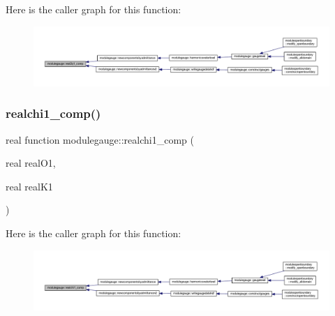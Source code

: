 Here is the caller graph for this function\+:\nopagebreak
\begin{figure}[H]
\begin{center}
\leavevmode
\includegraphics[width=350pt]{namespacemodulegauge_a3570d6ed4834d7d873f7b068c99c9ef5_icgraph}
\end{center}
\end{figure}
\mbox{\label{namespacemodulegauge_ab5f77ac1ee7d3ccaa97fe4e99a711bdb}} 
\subsubsection{\texorpdfstring{realchi1\+\_\+comp()}{realchi1\_comp()}}
{\footnotesize\ttfamily real function modulegauge\+::realchi1\+\_\+comp (\begin{DoxyParamCaption}\item[{real}]{real\+O1,  }\item[{real}]{real\+K1 }\end{DoxyParamCaption})\hspace{0.3cm}{\ttfamily [private]}}

Here is the caller graph for this function\+:\nopagebreak
\begin{figure}[H]
\begin{center}
\leavevmode
\includegraphics[width=350pt]{namespacemodulegauge_ab5f77ac1ee7d3ccaa97fe4e99a711bdb_icgraph}
\end{center}
\end{figure}
\mbox{\label{namespacemodulegauge_a21ce68783e04b0fd7b9b57cc33bb1117}} 
